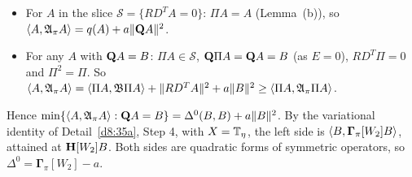 \begin{detail}
\begin{step}
\begin{itemize}
\item For $A$ in the slice $\mathcal S=\{RD^TA=0\}$: $\Pi A=A$ (Lemma~(b)), so $\langle A,\mathfrak A_\pi A\rangle=q(A)+a\|\mathbf Q A\|^2$.
\item For any $A$ with $\mathbf Q A=B$: $\Pi A\in\mathcal S$, $\mathbf Q\Pi A=\mathbf Q A=B$ (as $E=0$), $RD^T\Pi=0$ and $\Pi^2=\Pi$. So $\langle A,\mathfrak A_\pi A\rangle=\langle \Pi A,\mathfrak B\Pi A\rangle+\|RD^TA\|^2+a\|B\|^2\ge\langle \Pi A,\mathfrak A_\pi\Pi A\rangle$.
\end{itemize}
Hence $\min\{\langle A,\mathfrak A_\pi A\rangle:\mathbf Q A=B\}=\Delta^0(B,B)+a\|B\|^2$. By the variational identity of Detail~\ref{d8:35a}, Step 4, with $X=\mathbb T_\eta$, the left side is $\langle B,\boldsymbol\Gamma_\pi[W_2]B\rangle$, attained at $\mathbf H[W_2]B$. Both sides are quadratic forms of symmetric operators, so $\Delta^0=\boldsymbol\Gamma_\pi[W_2]-a$.
\end{step}
\end{detail}

